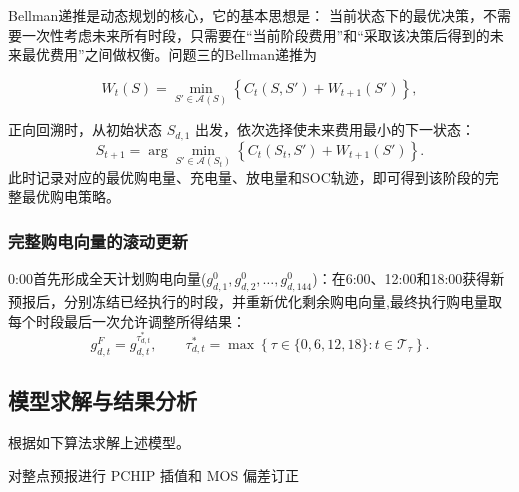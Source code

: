\documentclass{cumcm2026}
\begin{document}
Bellman递推是动态规划的核心，它的基本思想是：
当前状态下的最优决策，不需要一次性考虑未来所有时段，只需要在“当前阶段费用”和“采取该决策后得到的未来最优费用”之间做权衡。问题三的Bellman递推为

\begin{equation}
  W_t(S)
=\min_{S'\in\mathcal A(S)}
\left\{
C_t(S,S')
+W_{t+1}(S')
\right\},
\end{equation}

正向回溯时，从初始状态 $S_{d,1}$ 出发，依次选择使未来费用最小的下一状态：
\[
S_{t+1}
=
\arg\min_{S'\in\mathcal A(S_t)}
\left\{
C_t(S_t,S')
+
W_{t+1}(S')
\right\}.
\]此时记录对应的最优购电量、充电量、放电量和SOC轨迹，即可得到该阶段的完整最优购电策略。
\subsubsection{完整购电向量的滚动更新}

0:00首先形成全天计划购电向量($g_{d,1}^{0},g_{d,2}^{0},\ldots,g_{d,144}^{0}$)：在6:00、12:00和18:00获得新预报后，分别冻结已经执行的时段，并重新优化剩余购电向量,最终执行购电量取每个时段最后一次允许调整所得结果：
\[
g_{d,t}^{F}
=
g_{d,t}^{\tau^*_{d,t}},
\qquad
\tau^*_{d,t}
=
\max\left\{
\tau\in\{0,6,12,18\}:
t\in\mathcal T_{\tau}
\right\}.
\]



\subsection{模型求解与结果分析}
根据如下算法求解上述模型。








\begin{algorithm}[H]
\small
\linespread{0.9}\selectfont
\setlength{\algomargin}{1.1em}
\DontPrintSemicolon
\caption{问题三FV-RQDP模型求解算法}
\label{alg:q3-fv-rqdp}



对整点预报进行 PCHIP 插值和 MOS 偏差订正\;


\;
\end{algorithm}
\end{document}
